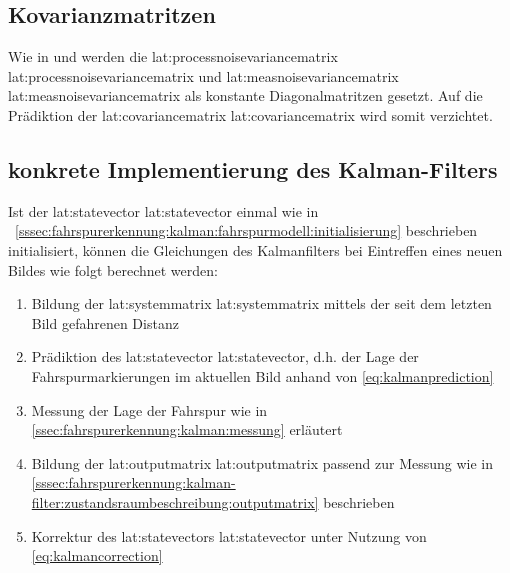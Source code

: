\subsection{Kovarianzmatritzen}
Wie in \autocite{petersfalkoFPGAbasierteBildverarbeitungspipelineZur2009} und \autocite{risackRobustLaneRecognition} werden die \glsdesc{lat:processnoisevariancematrix} \gls{lat:processnoisevariancematrix} und \glsdesc{lat:measnoisevariancematrix} \gls{lat:measnoisevariancematrix} als konstante Diagonalmatritzen gesetzt. Auf die Prädiktion der \glsdesc{lat:covariancematrix} \gls{lat:covariancematrix} wird somit verzichtet.

\subsection{konkrete Implementierung des Kalman-Filters}
Ist der \glsdesc{lat:statevector} \gls{lat:statevector} einmal wie in ~\ref{sssec:fahrspurerkennung:kalman:fahrspurmodell:initialisierung} beschrieben initialisiert, können die Gleichungen des Kalmanfilters bei Eintreffen eines neuen Bildes wie folgt berechnet werden:
\begin{enumerate}
\item Bildung der \glsdesc{lat:systemmatrix} \gls{lat:systemmatrix} mittels der seit dem letzten Bild gefahrenen Distanz 
\item Prädiktion des \glsdesc{lat:statevector} \gls{lat:statevector}, d.h. der Lage der Fahrspurmarkierungen im aktuellen Bild anhand von \eqref{eq:kalmanprediction}
\item Messung der Lage der Fahrspur wie in \ref{ssec:fahrspurerkennung:kalman:messung}
erläutert
\item Bildung der \glsdesc{lat:outputmatrix} \gls{lat:outputmatrix} passend zur Messung wie in \ref{sssec:fahrspurerkennung:kalman-filter:zustandsraumbeschreibung:outputmatrix} beschrieben
\item Korrektur des \glsdesc{lat:statevector}s \gls{lat:statevector} unter Nutzung von \eqref{eq:kalmancorrection}
\end{enumerate}




